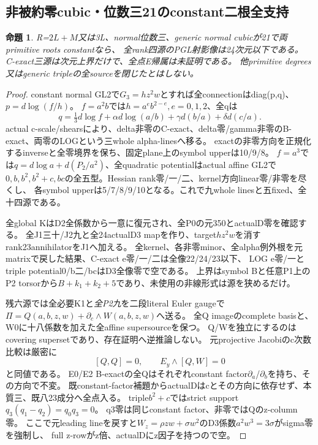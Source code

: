 \documentclass[a4paper,11pt]{ltjsarticle}
\newtheorem{proposition}{命題}[section]
\theoremstyle{definition}
\begin{document}
\subsection{非被約零cubic・位数三21のconstant二根全支持}
\begin{proposition}\label{prop:plane-nonreduced-m3-constant21-all-G}
R=$2L+M$又は3L、normal位数三、generic normal cubicが21で両primitive roots constantなら、
全rank四源のPGL射影像は24次元以下である。
C-exact三源は次元上界だけで、全点E帰属は未証明である。
他primitive degrees又はgeneric tripleの全sourceを閉じたとはしない。
\end{proposition}
\begin{proof}
constant normal GL2で$G_3=h z^2w$とすれば全connectionはdiag(p,q)、$p=d\log(f/h)$。
$f=a^2b$では$h=a^eb^{2-e},e=0,1,2$、全qは
\[
 q=\tfrac13d\log f+\alpha d\log(a/b)+\gamma d(b/a)+\delta d(c/a).
\]
actual c-scale/shearsにより、delta非零のC-exact、delta零/gamma非零のB-exact、両零のLOGという三whole alpha-linesへ移る。
exactの非零方向を正規化するinverseと全零境界を保ち、固定plane上のsymbol upperは10/9/8。
$f=a^3$では$q=d\log a+d(P_2/a^2)$、全quadratic potentialはactual affine GL2で
$0,b,b^2,b^2+c,bc$の全五型。Hessian rank零/一/二、kernel方向linear零/非零を尽くし、
各symbol upperは5/7/8/9/10となる。これで九whole linesと五fixed、全十四源である。

全global KはD2全係数から一意に復元され、全P0の元350とactualD零を確認する。
全J1三十/J2九と全24actualD3 mapを作り、target$h z^2w$を消すrank23annihilatorをJ1へ加える。
全kernel、各非零minor、全alpha例外根を元matrixで戻した結果、C-exact e零/一/二は全像22/24/23以下、
LOG e零/一とtriple potential0/b二/bcはD3全像零で空である。
上界はsymbol Bと任意P1上のP2 torsorから$B+k_1+k_2+5$であり、未使用の非線形式は源を狭めるだけ。

残六源では全必要K1と\emph{全P2九}を二段literal Euler gaugeで
$\Pi=Q(a,b,z,w)+\partial_c\wedge W(a,b,z,w)$へ送る。
全Q imageのcomplete basisと、W0に十八係数を加えた全affine supersourceを保つ。
Q/Wを独立にするのはcovering supersetであり、存在証明へ逆推論しない。
元projective Jacobiのc次数比較は厳密に
\[
 [Q,Q]=0,\qquad E_y\wedge[Q,W]=0
\]
と同値である。
E0/E2 B-exactの全Qはそれぞれconstant factor$\partial_a$/$\partial_b$を持ち、その方向で不変。
既constant-factor補題からactualDはcとその方向に依存せず、本質三、既八23成分へ全点入る。
triple$b^2+c$ではstrict support$q_3(q_1-q_2)=q_0q_3=0$。
q3零は同じconstant factor、非零ではQのz-column零。
ここで元leading lineを戻すと$W_z=\rho zw+\sigma w^2$のD3係数$a^2w^3=3\sigma$がsigma零を強制し、
full z-rowがz倍、actualDにz因子を持つので空。


\end{proof}
\end{document}

